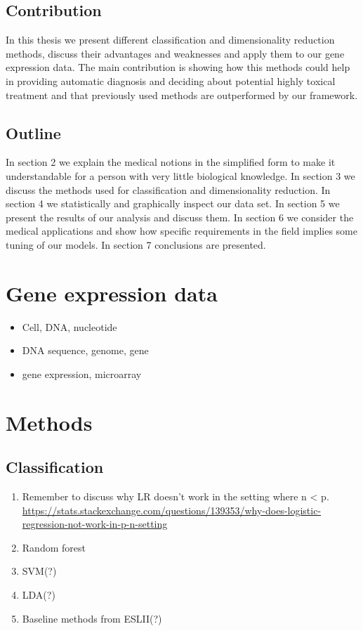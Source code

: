 \documentclass[12pt, wide]{mwart}
\begin{document}
\subsection{Contribution}

In this thesis we present different classification and dimensionality reduction methods, discuss their advantages and weaknesses and apply them to our gene expression data. The main contribution is showing how this methods could help in providing automatic diagnosis and deciding about potential highly toxical treatment and that previously used methods are outperformed by our framework.   

\subsection{Outline}
In section 2 we explain the medical notions in the simplified form to make it understandable for a person with very little biological knowledge. In section 3 we discuss the methods used for classification and dimensionality reduction. In section 4 we statistically and graphically inspect our data set. In section 5 we present the results of our analysis and discuss them. In section 6 we consider the medical applications and show how specific requirements in the field implies some tuning of our models. In section 7 conclusions are presented.

\noindent

\section{Gene expression data}

\begin{itemize}
    \item Cell, DNA, nucleotide
    \item DNA sequence, genome, gene
    \item gene expression, microarray
\end{itemize}

\section{Methods}

\subsection{Classification}

\begin{enumerate}
    \item Remember to discuss why LR doesn't work in the setting where n < p. \url{https://stats.stackexchange.com/questions/139353/why-does-logistic-regression-not-work-in-p-n-setting}
    \item Random forest
    \item SVM(?)
    \item LDA(?)
    \item Baseline methods from ESLII(?)
\end{enumerate}
\end{document}
